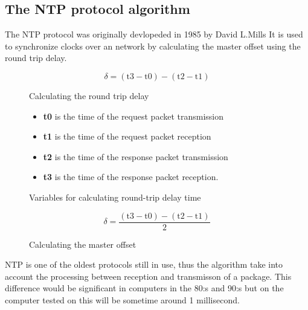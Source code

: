 \subsection{The NTP protocol algorithm}
\label{sec:ntp}

The NTP protocol was originally devlopeded in 1985 by David L.Mills %
It is used to synchronize clocks over an network by calculating the master offset using the round trip delay.

\begin{figure}[h!]
	\begin{displaymath}
		\delta = (\text{t3} - \text{t0}) - (\text{t2} - \text{t1})
	\end{displaymath}
	\caption{Calculating the round trip delay}
	\label{fig:ntpdelta}
\end{figure}


\begin{figure}[h!]
\begin{itemize}
  \item[] \textbf{t0} is the time of the request packet transmission
  \item[] \textbf{t1} is the time of the request packet reception
  \item[] \textbf{t2} is the time of the response packet transmission
  \item[] \textbf{t3} is the time of the response packet reception.
\end{itemize}
\caption{Variables for calculating round-trip delay time}
\label{fig:ntpvars}
\end{figure}

\begin{figure}[h!]
	\begin{displaymath}
		\delta = \frac{(\text{t3} - \text{t0}) - (\text{t2} - \text{t1})}{2}
	\end{displaymath}
	\caption{Calculating the master offset}
	\label{fig:ntpmo}
\end{figure}



NTP is one of the oldest protocols still in use, thus the algorithm take into account the processing between reception and transmisson of a package. This difference would be significant in computers in the 80:s and 90:s but on the computer tested on %
this will be sometime around 1 millisecond. 
